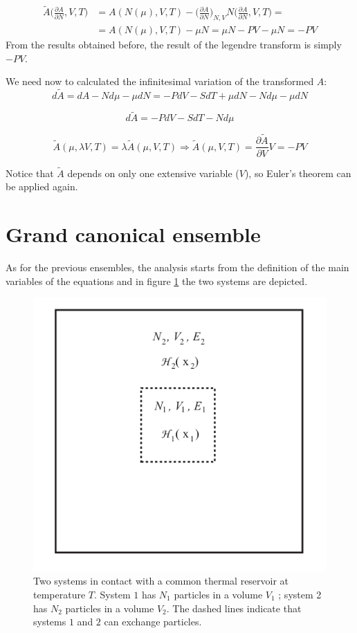 	\begin{align*}
		\tilde{A}\biggl(\frac{\partial A}{\partial N}, V, T\biggr) &= A(N(\mu), V, T)-\biggl(\frac{\partial A}{\partial N}\biggr)_{N, V}N\biggl(\frac{\partial A}{\partial N}, V, T\biggr) = \\
																															 &=A(N(\mu), V, T) - \mu N = \mu N - PV - \mu N = -PV
	\end{align*}
	From the results obtained before, the result of the legendre transform is simply $-PV$. 
	
	We need now to calculated the infinitesimal variation of the transformed $A$:
	$$d\tilde{A} = dA - Nd \mu -\mu dN = -PdV - SdT + \mu dN -Nd\mu - \mu dN$$

	$$d\tilde{A} = -PdV - SdT - Nd\mu$$

	$$\tilde{A}(\mu, \lambda V, T) = \lambda\tilde{A}(\mu, V, T)\Rightarrow \tilde{A}(\mu, V, T) = \frac{\partial \tilde{A}}{\partial V}V = -PV$$
	
	Notice that $\tilde{A}$ depends on only one extensive variable ($V$), so Euler's theorem can be applied again.
	
	
\section{Grand canonical ensemble}
As for the previous ensembles, the analysis starts from the definition of the main variables of the equations and in figure \ref{fig:grand} the two systems are depicted. 

\begin{figure}
\center
\includegraphics[scale=2]{grand.png}
\caption{Two systems in contact with a common thermal reservoir at temperature $T$. System $1$ has $N_1$ particles in a volume $V_1$ ; system 2 has $N_2$ particles in a volume $V_2$. The dashed lines indicate that systems $1$ and $2$ can exchange particles.}
\label{fig:grand}
\end{figure}

